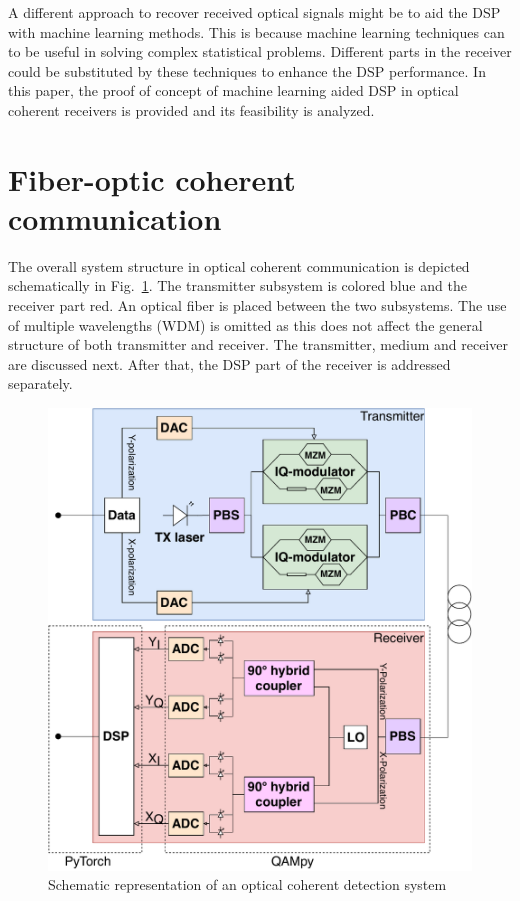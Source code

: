 \documentclass[journal,10pt,twoside, a4paper]{IEEEtran}
\begin{document}
A different approach to recover received optical signals might be to aid the DSP with machine learning methods. This is because machine learning techniques can to be useful in solving complex statistical problems. Different parts in the receiver could be substituted by these techniques to enhance the DSP performance. In this paper, the proof of concept of machine learning aided DSP in optical coherent receivers is provided and its feasibility is analyzed.

\section{Fiber-optic coherent communication}
The overall system structure in optical coherent communication is depicted schematically in Fig.~\ref{fig:coherent_detection}. The transmitter subsystem is colored blue and the receiver part red. An optical fiber is placed between the two subsystems. The use of multiple wavelengths (WDM) is omitted as this does not affect the general structure of both transmitter and receiver. The transmitter, medium and receiver are discussed next. After that, the DSP part of the receiver is addressed separately.

\begin{figure}
    \centering
    \includegraphics[width=0.9\linewidth]{images/coherent_detection}
    \caption{Schematic representation of an optical coherent detection system}
    \label{fig:coherent_detection}
\end{figure}
\end{document}
